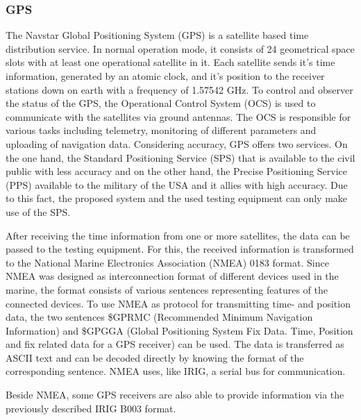 \subsubsection{GPS}
The Navstar Global Positioning System (GPS) is a satellite based time distribution service. In normal operation mode, it consists of 24 geometrical space slots with at least one operational satellite in it. Each satellite sends it's time information, generated by an atomic clock, and it's position to the receiver stations down on earth with a frequency of 1.57542 GHz. To control and observer the status of the GPS, the Operational Control System (OCS) is used to communicate with the satellites via ground antennas. The OCS is responsible for various tasks including telemetry, monitoring of different parameters and uploading of navigation data. Considering accuracy, GPS offers two services. On the one hand, the Standard Positioning Service (SPS) that is available to the civil public with less accuracy and on the other hand, the Precise Positioning Service (PPS) available to the military of the USA and it allies with high accuracy\cite{gps}. Due to this fact, the proposed system and the used testing equipment can only make use of the SPS.


After receiving the time information from one or more satellites, the data can be passed to the testing equipment. For this, the received information is transformed to the National Marine Electronics Association (NMEA) 0183 format. Since NMEA was designed as interconnection format of different devices used in the marine, the format consists of various sentences representing features of the connected devices. To use NMEA as protocol for transmitting time- and position data, the two sentences \$GPRMC (Recommended Minimum Navigation Information) and \$GPGGA (Global Positioning System Fix Data. Time, Position and fix related data for a GPS receiver) can be used. The data is transferred as ASCII text and can be decoded directly by knowing the format of the corresponding sentence. NMEA uses, like IRIG, a serial bus for communication\cite{nmea}.

Beside NMEA, some GPS receivers are also able to provide information via the previously described IRIG B003 format.

